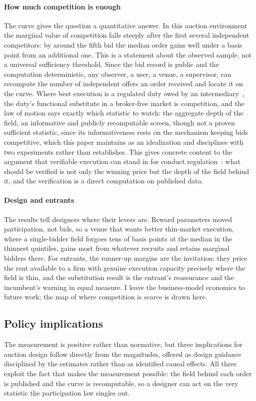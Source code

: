 \documentclass[11pt]{article}
\theoremstyle{plain}
\theoremstyle{definition}
\theoremstyle{remark}
\begin{document}
\paragraph{How much competition is enough} The curve gives the question a quantitative answer. In this auction environment the marginal value of competition falls steeply after the first several independent competitors: by around the fifth bid the median order gains well under a basis point from an additional one. This is a statement about the observed sample, not a universal sufficiency threshold. Since the bid record is public and the computation deterministic, any observer, a user, a venue, a supervisor, can recompute the number of independent offers an order received and locate it on the curve. Where best execution is a regulated duty owed by an intermediary~\citep{mifid2,finsa,finra5310}, the duty's functional substitute in a broker-free market is competition, and the law of motion says exactly which statistic to watch: the aggregate depth of the field, an informative and publicly recomputable screen, though not a proven sufficient statistic, since its informativeness rests on the mechanism keeping bids competitive, which this paper maintains as an idealization and disciplines with two experiments rather than establishes. This gives concrete content to the argument that verifiable execution can stand in for conduct regulation~\citep{le2026fairness}: what should be verified is not only the winning price but the depth of the field behind it, and the verification is a direct computation on published data.

\paragraph{Design and entrants} The results tell designers where their levers are. Reward parameters moved participation, not bids, so a venue that wants better thin-market execution, where a single-bidder field forgoes tens of basis points at the median in the thinnest quintiles, gains most from whatever recruits and retains marginal bidders there. For entrants, the runner-up margins are the invitation: they price the rent available to a firm with genuine execution capacity precisely where the field is thin, and the substitution result is the entrant's reassurance and the incumbent's warning in equal measure. I leave the business-model economics to future work; the map of where competition is scarce is drawn here.

\subsection{Policy implications}\label{sec:policy}
The measurement is positive rather than normative, but three implications for auction design follow directly from the magnitudes, offered as design guidance disciplined by the estimates rather than as identified causal effects. All three exploit the fact that makes the measurement possible: the field behind each order is published and the curve is recomputable, so a designer can act on the very statistic the participation law singles out.
\end{document}
